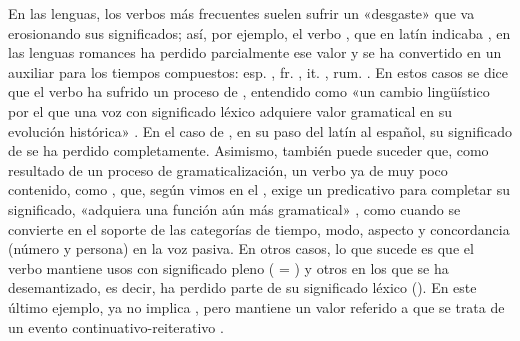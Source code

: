 \begin{recuadro}
En las lenguas, los verbos más frecuentes suelen sufrir un «desgaste» que va
erosionando sus significados; así, por ejemplo, el verbo , que en
latín indicaba , en las lenguas romances ha perdido parcialmente
ese valor y se ha convertido en un auxiliar para los tiempos compuestos: esp.
, fr. , it. , rum. . En estos
casos se dice que el verbo ha sufrido un proceso de
, entendido como «un cambio lingüístico por el que una
voz con significado léxico adquiere valor gramatical en su evolución histórica»
\parencite[147]{bosque2019}. En el caso de , en su paso del latín
al español, su significado de  se ha perdido completamente.
Asimismo, también puede suceder que, como resultado de un proceso de
gramaticalización, un verbo ya de muy poco contenido, como , que,
según vimos en el , exige un predicativo para completar su
significado, «adquiera una función aún más gramatical»
\parencite{company2003}, como cuando se convierte en el soporte de las
categorías de tiempo, modo, aspecto y concordancia (número y persona) en la voz
pasiva. En otros casos, lo que sucede es que el verbo mantiene usos con
significado pleno ( = )
y otros en los que se ha desemantizado, es decir, ha perdido parte de su
significado léxico ().
En este último ejemplo,  ya no implica , pero
mantiene un valor referido a que se trata de un evento continuativo-reiterativo
\parencite{yllera1999}.


\end{recuadro}
